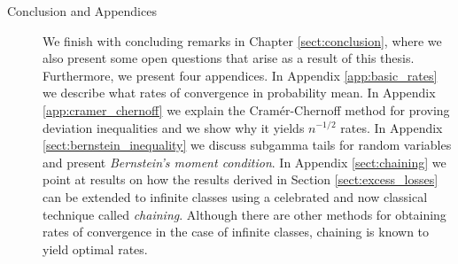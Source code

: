 \documentclass{uvamath}
\theoremstyle{remark}
\theoremstyle{definition}
\theoremstyle{definition}
\theoremstyle{definition}
\theoremstyle{definition}
\theoremstyle{definition}
\begin{document}
\begin{description}
\item[Conclusion and Appendices] We finish with concluding remarks in
  Chapter \ref{sect:conclusion}, where we also present some open
  questions that arise as a result of this thesis. Furthermore, we
  present four appendices. In Appendix \ref{app:basic_rates} we
  describe what rates of convergence in probability mean. In Appendix
  \ref{app:cramer_chernoff} we explain the Cramér-Chernoff method for
  proving deviation inequalities and we show why it yields $n^{-1/2}$
  rates. In Appendix \ref{sect:bernstein_inequality} we discuss
  subgamma tails for random variables and present \textit{Bernstein's
    moment condition}.  In Appendix \ref{sect:chaining} we point at
  results on how the results derived in Section
  \ref{sect:excess_losses} can be extended to infinite classes using a
  celebrated and now classical technique called
  \textit{chaining}. Although there are other methods for obtaining
  rates of convergence in the case of infinite classes, chaining is
  known to yield optimal rates.
\end{description}


\end{document}
